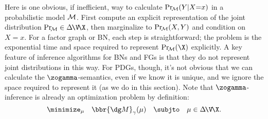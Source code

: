 Here is one obvious, if inefficient, way to calculate $\Pr_{\!\cal M}(Y|X{=}x)$ in a
probabilistic model $\cal M$. 
First compute an explicit representation of the joint distribution 
$\Pr_{\!\cal M} \in \Delta\mskip-2mu\V\!\X$, 
then marginalize to 
$\Pr_{\!\cal M}(X,Y)$ and condition on $X{=}x$.
%
For a factor graph or BN,
each step is
straightforward;
the problem is the exponential time and space required to represent $\Pr_{\!\cal M}(\X)$ explicitly.
A key feature of inference algorithms for BNs and FGs is that they
do not represent joint distributions in this way.
%
For PDGs, though, it's not
obvious that
we can calculate the $\zogamma$-semantics,
even if
we know it is unique, and
we ignore the space required to represent it (as we do in this section).
Note that $\zogamma$-inference is already an optimization problem by definition:
\[
    \minimize_\mu\quad
        \bbr{\dg M}_\gamma(\mu)
    \quad \subjto\quad \mu \in \Delta\mskip-2mu\V\mskip-2mu\X.
\]
